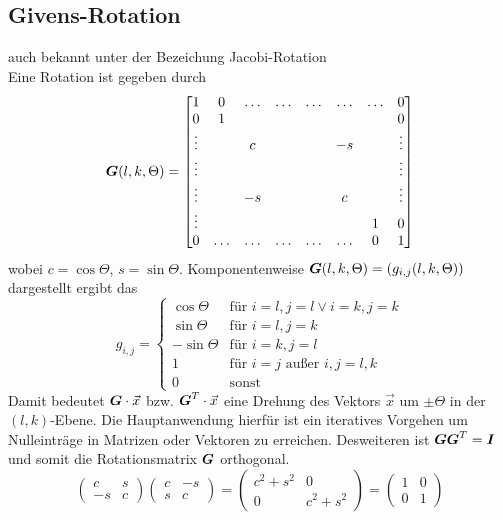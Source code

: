 \subsection{Givens-Rotation}
auch bekannt unter der Bezeichung Jacobi-Rotation \\
Eine Rotation ist gegeben durch
\begin{equation}
	\boldsymbol {G}(l, k, \Theta) = 
	\begin{bmatrix}
		1 & 0 & \hdots & \hdots & \hdots & \hdots & \hdots & 0 \\
		0 & 1 & & & & & & 0 \\
		\vdots & & c & & & -s & & \vdots \\
		\vdots & & & & & & & \vdots \\
		\vdots & & -s & & & c & & \vdots \\ 
		\vdots & & & & & & 1 & 0 \\ 
		0 & \hdots & \hdots & \hdots & \hdots & \hdots & 0 & 1 
	\end{bmatrix}
\end{equation}
wobei $c = \cos \Theta$, $s = \sin \Theta$. Komponentenweise $\boldsymbol {G}(l, k, \Theta) =  (g_{i,j}(l, k, \Theta))$ dargestellt ergibt das
\begin{equation}
	g_{i,j} = 
	\begin{cases} 
		\cos \Theta & \text{für } i = l, j = l \vee i = k, j = k \\
		\sin \Theta & \text{für } i = l, j = k \\
		- \sin \Theta & \text{für } i = k, j = l \\
		1 & \text{für } i = j \text{ außer } i, j = l, k \\
		0 & \text{sonst}
	\end{cases}
\end{equation}
Damit bedeutet $\boldsymbol {G} \cdot \vec x$ bzw. $\boldsymbol {G}^T \cdot \vec x$ eine Drehung des Vektors $\vec x$ um $\pm \Theta$ in der $(l, k)$-Ebene. Die Hauptanwendung hierfür ist ein iteratives Vorgehen um Nulleinträge in Matrizen oder Vektoren zu erreichen. Desweiteren ist $\boldsymbol {G} \boldsymbol {G}^T = \boldsymbol {I}$ und somit die Rotationsmatrix $\boldsymbol {G}$ orthogonal.
\begin{equation}
	\begin{pmatrix}
		c & s \\
		-s & c
	\end{pmatrix} 
	\begin{pmatrix}
		c & -s \\
		s & c
	\end{pmatrix} = 
	\begin{pmatrix}
		c^2 + s^2 & 0 \\
		0 & c^2 + s^2
	\end{pmatrix} =
	\begin{pmatrix}
		1 & 0 \\
		0 & 1
	\end{pmatrix} 
\end{equation}
